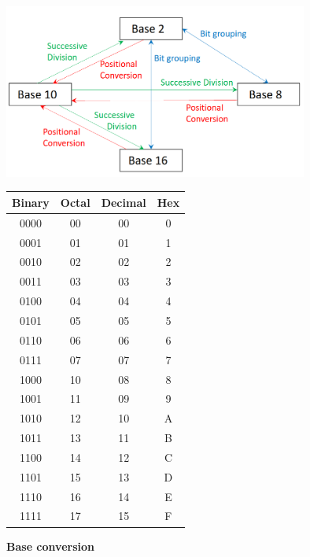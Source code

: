 \documentclass{article}
\begin{document}
\begin{center}
    \includegraphics[align=c, width=10cm]{conversions.png}
    \hspace{2cm}
    \begin{tabular}{|c|c|c|c|}
        \hline
        Binary & Octal & Decimal & Hex \\
        \hline
        0000 & 00 & 00 & 0 \\
        0001 & 01 & 01 & 1 \\
        0010 & 02 & 02 & 2 \\
        0011 & 03 & 03 & 3 \\
        0100 & 04 & 04 & 4 \\
        0101 & 05 & 05 & 5 \\
        0110 & 06 & 06 & 6 \\
        0111 & 07 & 07 & 7 \\
        1000 & 10 & 08 & 8 \\
        1001 & 11 & 09 & 9 \\
        1010 & 12 & 10 & A \\
        1011 & 13 & 11 & B \\
        1100 & 14 & 12 & C \\
        1101 & 15 & 13 & D \\
        1110 & 16 & 14 & E \\
        1111 & 17 & 15 & F \\
        \hline
    \end{tabular}
\end{center}
\textbf{Base conversion}
\end{document}
